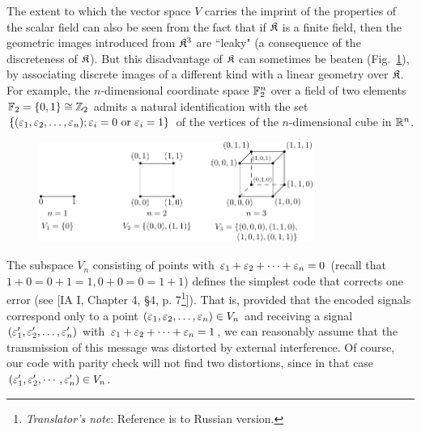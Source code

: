 The extent to which the vector space $V$ carries the imprint of the properties of the scalar field can also be seen from the fact that if ${\mathfrak{K}}$ is a finite field, then the geometric images introduced from ${\mathfrak{K}}^3$ are ``leaky" (a consequence of the discreteness of ${\mathfrak{K}}$). But this disadvantage of ${\mathfrak{K}}$ can sometimes be beaten (Fig.~\ref{fig:discrete-image}), by associating discrete images of a different kind with a linear geometry over ${\mathfrak{K}}$. For example, the $n$-dimensional coordinate space ${\mathbb{F}}_2^n$ over a field of two elements ${\mathbb{F}}_2 =\{0,1\}\cong{\mathbb{Z}}_2$ admits a natural identification with the set $\{(\varepsilon_1 ,\varepsilon_2 ,\dots ,\varepsilon_n ); \varepsilon_i =0 \text{ or } \varepsilon_i = 1\}$ of the vertices of the $n$-dimensional cube in ${\mathbb{R}}^n$.

\begin{figure}
	\centering
	\includegraphics[width=0.8\textwidth]{../fig/fig-1.pdf}
	\caption{}
	\label{fig:discrete-image}
\end{figure}

The subspace $V_n$ consisting of points with $\varepsilon_1 +\varepsilon_2 + \dots + \varepsilon_n = 0$ (recall that $1 + 0 = 0 + 1 = 1, 0 + 0 = 0 = 1 + 1$) defines the simplest code that corrects one error (see [IA I, Chapter 4, \S4, p. 7\footnote{\textit{Translator's note}: Reference is to Russian version.}]). That is, provided that the encoded signals correspond only to a point $(\varepsilon_1 ,\varepsilon_2 ,\dots ,\varepsilon_n )\in V_n$ and receiving a signal $(\varepsilon_1 ',\varepsilon_2 ',\dots ,\varepsilon_n ')$ with $\varepsilon_1 +\varepsilon_2 + \dots + \varepsilon_n = 1$, we can reasonably assume that the transmission of this message was distorted by external interference. Of course, our code with parity check will not find two distortions, since in that case $(\varepsilon_1 ',\varepsilon_2 ',\cdots ,\varepsilon_n ') \in V_n$.